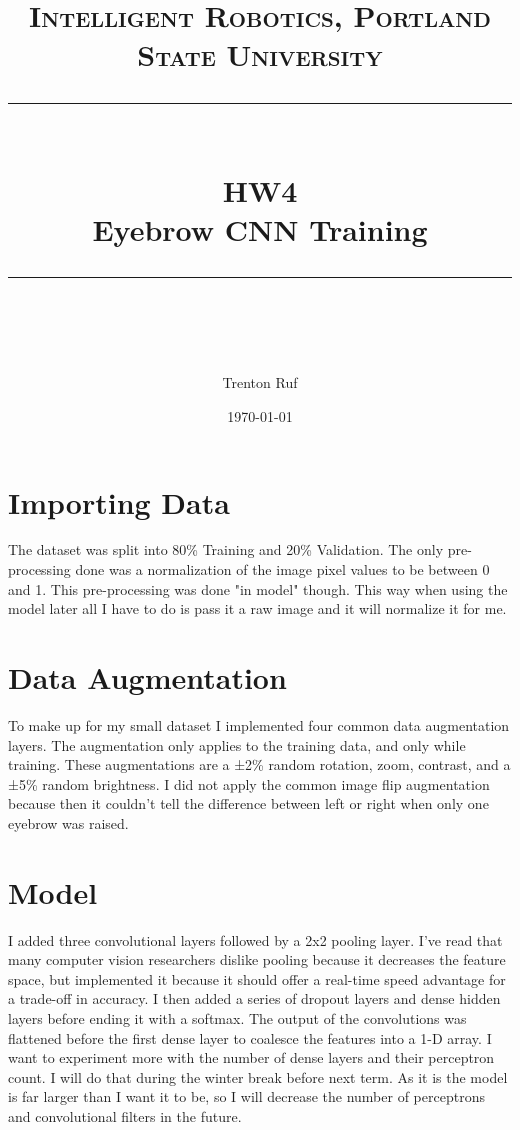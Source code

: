 \documentclass[11pt]{scrartcl} %
\title{	
	\normalfont\normalsize
	\textsc{Intelligent Robotics, Portland State University}\\ %
	\vspace{25pt} %
	\rule{\linewidth}{0.5pt}\\ %
	\vspace{20pt} %
	{\huge HW4}\\ %
	\vspace{4pt} %
	{\large Eyebrow CNN Training}\\ %
	\vspace{12pt} %
	\rule{\linewidth}{2pt}\\ %
	\vspace{12pt} %
}
\author{\LARGE Trenton Ruf} %
\date{\normalsize \today} %
\begin{document}
\maketitle %




\renewcommand\thesubsection{\Roman{subsection}}

\section{Importing Data}
The dataset was split into 80\% Training and 20\% Validation. 
The only pre-processing done was a normalization of the image pixel values to be between 0 and 1.
This pre-processing was done "in model" though. 
This way when using the model later all I have to do is pass it a raw image and it will normalize it for me.

\section{Data Augmentation}
To make up for my small dataset I implemented four common data augmentation layers. The augmentation only applies to the training data, and only while training. These augmentations are a ±2\% random rotation, zoom, contrast, and a ±5\% random brightness. I did not apply the common image flip augmentation because then it couldn't tell the difference between left or right when only one eyebrow was raised.


\section{Model}
I added three convolutional layers followed by a 2x2 pooling layer. 
I've read that many computer vision researchers dislike pooling because it decreases the feature space, but implemented it because it should offer a real-time speed advantage for a trade-off in accuracy.
I then added a series of dropout layers and dense hidden layers before ending it with a softmax.
The output of the convolutions was flattened before the first dense layer to coalesce the features into a 1-D array.
I want to experiment more with the number of dense layers and their perceptron count. I will do that during the winter break before next term.
As it is the model is far larger than I want it to be, so I will decrease the number of perceptrons and convolutional filters in the future.
\end{document}
